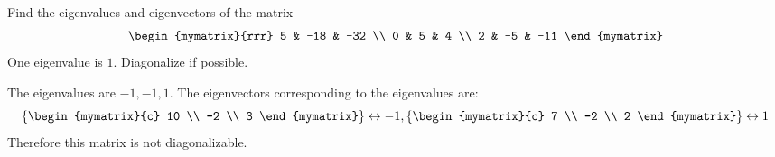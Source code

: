 \begin{enumialphparenastyle}

\begin{ex} Find the eigenvalues and eigenvectors of the matrix 
\begin{equation*}
\begin{mymatrix}{rrr}
5 & -18 & -32 \\
0 & 5 & 4 \\
2 & -5 & -11
\end{mymatrix}
\end{equation*}
One eigenvalue is $1.$ Diagonalize if possible.
\begin{sol}
The eigenvalues are $-1, -1, 1$. The eigenvectors corresponding to the eigenvalues are:
\[
\left\{ \begin{mymatrix}{c}
10 \\
-2 \\
3
\end{mymatrix} \right\} \leftrightarrow -1,  \left\{ \begin{mymatrix}{c}
7 \\
-2 \\
2
\end{mymatrix} \right\} \leftrightarrow 1
\]
Therefore this matrix is not diagonalizable. 
\end{sol}
\end{ex}


\end{enumialphparenastyle}
